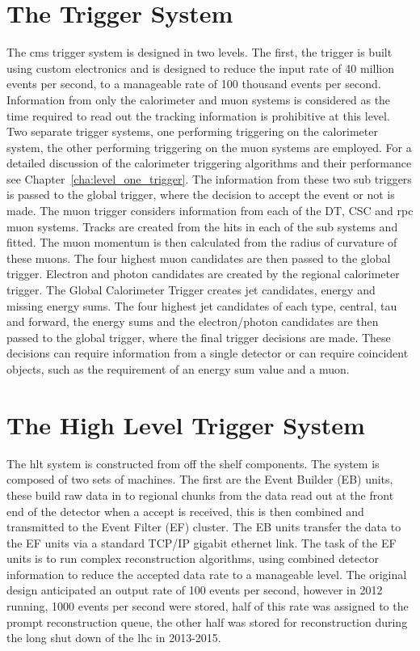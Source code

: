 \section{The \Lone Trigger System} %
\label{sec:the_level_one_trigger_system}
The \ac{cms} trigger system is designed in two levels. The first, the \Lone
trigger is built using custom electronics and is designed to reduce the input
rate of 40 million events per second, to a manageable rate of 100 thousand
events per second. Information from only the calorimeter and muon systems is
considered as the time required to read out the tracking information is
prohibitive at this level. Two separate trigger systems, one performing
triggering on the calorimeter system, the other performing triggering on the
muon systems are employed. For a detailed discussion of the calorimeter
triggering algorithms and their performance see
Chapter~\ref{cha:level_one_trigger}. The information from these two sub
triggers is passed to the global trigger, where the decision to accept the
event or not is made.
The muon trigger considers information from each of the DT, CSC and \ac{rpc}
muon systems. Tracks are created from the hits in each of the sub systems and
fitted. The muon momentum is then calculated from the radius of curvature of
these muons. The four highest \PT muon candidates are then passed to the global
trigger.
Electron and photon candidates are created by the regional calorimeter trigger.
The Global Calorimeter Trigger creates jet candidates, energy and missing energy sums. The four highest \ET jet candidates of each type, central, tau and forward, the energy sums and the electron/photon candidates are then passed to the global trigger, where the final trigger decisions are made. These decisions can require information from a single detector or can require coincident objects, such as the requirement of an energy sum value and a muon.

\section{The High Level Trigger System} %
\label{sec:the_high_level_trigger_system}
The \ac{hlt} system is constructed from off the shelf components.
The system is composed of two sets of machines. The first are the Event Builder
(EB) units, these build raw data in to regional chunks from the data read out
at the front end of the detector when a \Lone accept is received, this is then 
combined and transmitted to the Event Filter (EF) cluster. The EB units 
transfer the data to the EF units via a standard TCP/IP gigabit ethernet link.
The task of the EF units is to run complex reconstruction algorithms, using
combined detector information to reduce the accepted data rate to a manageable 
level. The original design anticipated an output rate of 100 events per second, 
however in 2012 running, 1000 events per second were stored, half of this rate 
was assigned to the prompt reconstruction queue, the other half was stored for 
reconstruction during the long shut down of the \ac{lhc} in 2013-2015.

